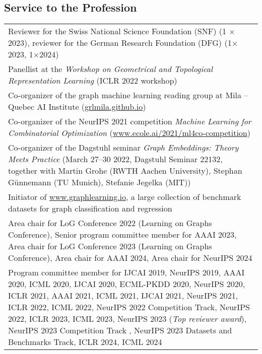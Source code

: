 \documentclass[11pt, a4paper, DIV=14, headings=small]{scrartcl}
\begin{document}
	\subsection*{Service to the Profession}
	\begin{longtabu}{p{14.5cm}} 
	    Reviewer for the Swiss National Science Foundation (SNF) (1 $\times$ 2023), reviewer for the German Research Foundation (DFG) (1$\times$2023, 1$\times$2024) \\[2.5em]
	    
		Panellist at the \emph{Workshop on Geometrical and Topological Representation Learning} (ICLR 2022 workshop) \\
		Co-organizer of the graph machine learning reading group at Mila -- Quebec AI Institute (\url{grlmila.github.io}) \\
		
		Co-organizer of the NeurIPS 2021 competition \emph{Machine Learning for Combinatorial Optimization} (\url{www.ecole.ai/2021/ml4co-competition}) \\
		
		Co-organizer of the Dagstuhl seminar \emph{Graph Embeddings: Theory Meets Practice} (March 27–30 2022, Dagstuhl Seminar 22132, together with Martin Grohe (RWTH Aachen University), Stephan Günnemann (TU Munich), Stefanie Jegelka (MIT)) \\
		
		Initiator of \url{www.graphlearning.io}, a large collection of benchmark datasets for graph classification and regression \\
		
		Area chair for LoG Conference 2022 (Learning on Graphs Conference), Senior program committee member for AAAI 2023, Area chair for LoG Conference 2023 (Learning on Graphs Conference), Area chair for AAAI 2024, Area chair for NeurIPS 2024 \\
		
		Program committee member for IJCAI 2019, NeurIPS  2019, AAAI 2020, ICML 2020, IJCAI 2020, ECML-PKDD 2020, NeurIPS 2020, ICLR 2021, AAAI 2021, ICML 2021, IJCAI 2021, NeurIPS 2021, ICLR 2022, ICML 2022, NeurIPS 2022 Competition Track, NeurIPS 2022, ICLR 2023, ICML 2023, NeurIPS 2023 (\emph{Top reviewer award}), NeurIPS 2023 Competition Track , NeurIPS 2023 Datasets and Benchmarks Track, ICLR 2024, ICML 2024 \\
		

\end{longtabu}
\end{document}
